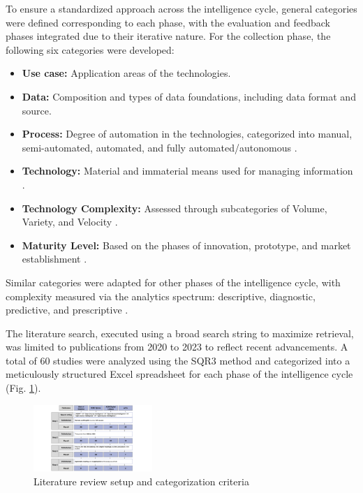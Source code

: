 \documentclass[10pt]{article}
\begin{document}
To ensure a standardized approach across the intelligence cycle, general categories were defined corresponding to each phase, with the evaluation and feedback phases integrated due to their iterative nature. For the collection phase, the following six categories were developed:
\begin{itemize}
    \item \textbf{Use case:} Application areas of the technologies.
    \item \textbf{Data:} Composition and types of data foundations, including data format and source.
    \item \textbf{Process:} Degree of automation in the technologies, categorized into manual, semi-automated, automated, and fully automated/autonomous \cite{Duncheon.2002, Billings.1997, Endsley.1999}.
    \item \textbf{Technology:} Material and immaterial means used for managing information \cite{Bleck.2004}.
    \item \textbf{Technology Complexity:} Assessed through subcategories of Volume, Variety, and Velocity \cite{Elgendy.2014, Singh.2012}.
    \item \textbf{Maturity Level:} Based on the phases of innovation, prototype, and market establishment \cite{Stich.2022}.
\end{itemize}

Similar categories were adapted for other phases of the intelligence cycle, with complexity measured via the analytics spectrum: descriptive, diagnostic, predictive, and prescriptive \cite{Delen.2013}.

The literature search, executed using a broad search string to maximize retrieval, was limited to publications from 2020 to 2023 to reflect recent advancements. A total of 60 studies were analyzed using the SQR3 method \cite{Robinson.1970} and categorized into a meticulously structured Excel spreadsheet for each phase of the intelligence cycle (Fig. \ref{fig:LiteratureReview}).

\begin{figure}[t]
    \centering
    \includegraphics[width=0.4\textwidth]{PDF/images/crop_Kategorisierungskriterien und Literraturreviewaufbau}
    \caption{Literature review setup and categorization criteria}
    \label{fig:LiteratureReview}
\end{figure}
\end{document}

